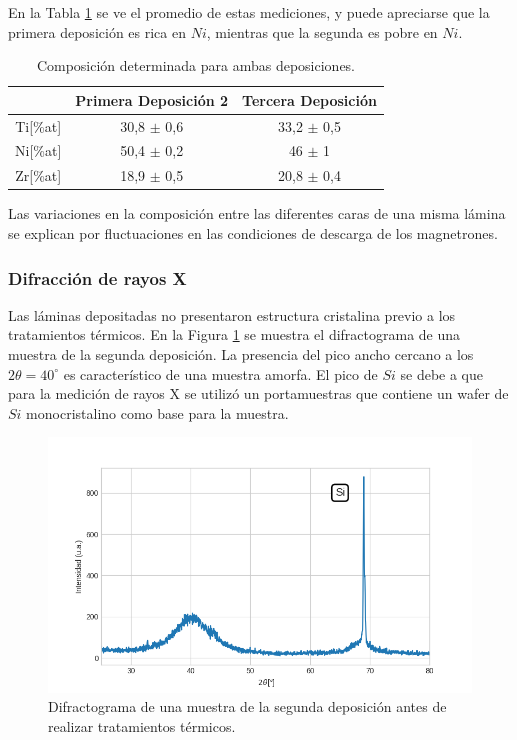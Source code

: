 \documentclass[12pt]{article}
\theoremstyle{definition}
\theoremstyle{remark}
\begin{document}
{En la Tabla \ref{compositionAvg} se ve el promedio de estas mediciones, y puede apreciarse que la primera deposición es rica en $Ni$, mientras que la segunda es pobre en $Ni$.


\begin{table}[H]
\centering
\begin{tabular}{c|c|c|}
\cline{2-3}
\multicolumn{1}{l|}{} & Primera Deposición 2 & Tercera Deposición \\ \hline
\multicolumn{1}{|c|}{Ti{[}\%at{]}} & 30,8 $\pm$ 0,6 & 33,2 $\pm$ 0,5 \\ \hline
\multicolumn{1}{|c|}{Ni{[}\%at{]}} & 50,4 $\pm$ 0,2 & 46 $\pm$ 1 \\ \hline
\multicolumn{1}{|c|}{Zr{[}\%at{]}} & 18,9 $\pm$ 0,5 & 20,8 $\pm$ 0,4 \\ \hline
\end{tabular}
\caption{Composición determinada para ambas deposiciones.}
\label{compositionAvg}
\end{table}

Las variaciones en la composición entre las diferentes caras de una misma lámina se explican por fluctuaciones en las condiciones de descarga de los magnetrones. 

\subsubsection{Difracción de rayos X}
Las láminas depositadas no presentaron estructura cristalina previo a los tratamientos térmicos. En la Figura \ref{amorfo} se muestra el difractograma de una muestra de la segunda deposición. La presencia del pico ancho cercano a los $2\theta=40^\circ$  es característico de una muestra amorfa. El pico de $Si$ se debe a que para la medición de rayos X se utilizó un portamuestras que contiene un wafer  de $Si$ monocristalino como base para la muestra.

\begin{figure}[H]
 	\centering
	\includegraphics[scale=0.6]{img/RX_amorfo.png}
 	\caption{Difractograma de una muestra de la segunda deposición antes de realizar tratamientos térmicos.}
	\label{amorfo}
\end{figure}


}
\end{document}
